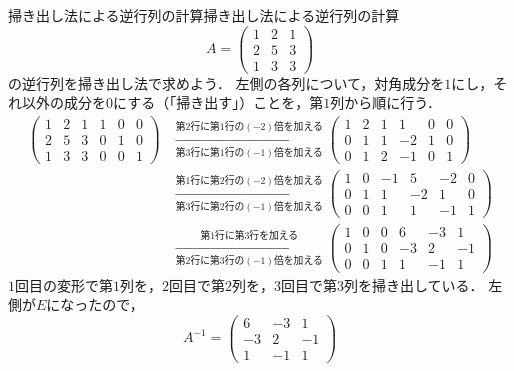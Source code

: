 \begin{example}{掃き出し法による逆行列の計算}{掃き出し法による逆行列の計算}
  \[
    A = \begin{pmatrix} 1 & 2 & 1 \\ 2 & 5 & 3 \\ 1 & 3 & 3 \end{pmatrix}
  \]
  の逆行列を掃き出し法で求めよう．
  左側の各列について，対角成分を$1$にし，それ以外の成分を$0$にする（「掃き出す」）ことを，第$1$列から順に行う．
  \begin{align*}
    \left(
    \begin{array}{ccc|ccc}
      1 & 2 & 1 & 1 & 0 & 0 \\
      2 & 5 & 3 & 0 & 1 & 0 \\
      1 & 3 & 3 & 0 & 0 & 1
    \end{array}
    \right)
    &\xrightarrow[\text{第3行に第1行の$(-1)$倍を加える}]{\text{第2行に第1行の$(-2)$倍を加える}}
    \left(
    \begin{array}{ccc|ccc}
      1 & 2 & 1 & 1 & 0 & 0 \\
      0 & 1 & 1 & -2 & 1 & 0 \\
      0 & 1 & 2 & -1 & 0 & 1
    \end{array}
    \right) \\
    &\xrightarrow[\text{第3行に第2行の$(-1)$倍を加える}]{\text{第1行に第2行の$(-2)$倍を加える}}
    \left(
    \begin{array}{ccc|ccc}
      1 & 0 & -1 & 5 & -2 & 0 \\
      0 & 1 & 1 & -2 & 1 & 0 \\
      0 & 0 & 1 & 1 & -1 & 1
    \end{array}
    \right) \\
    &\xrightarrow[\text{第2行に第3行の$(-1)$倍を加える}]{\text{第1行に第3行を加える}}
    \left(
    \begin{array}{ccc|ccc}
      1 & 0 & 0 & 6 & -3 & 1 \\
      0 & 1 & 0 & -3 & 2 & -1 \\
      0 & 0 & 1 & 1 & -1 & 1
    \end{array}
    \right)
  \end{align*}
  $1$回目の変形で第$1$列を，$2$回目で第$2$列を，$3$回目で第$3$列を掃き出している．
  左側が$E$になったので，
  \[
    A^{-1} = \begin{pmatrix} 6 & -3 & 1 \\ -3 & 2 & -1 \\ 1 & -1 & 1 \end{pmatrix}
\]
\end{example}
